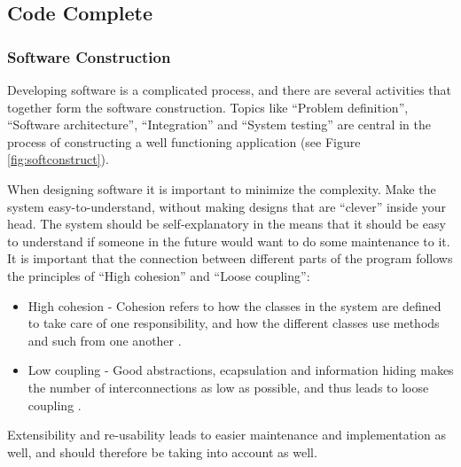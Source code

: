 \subsection{Code Complete}
\subsubsection{Software Construction}
\label{sec:softconstruct}
Developing software is a complicated process, and there are several activities that together form the software construction. Topics like ``Problem definition'', ``Software architecture'', ``Integration'' and ``System testing'' are central in the process of constructing a well functioning application (see Figure \ref{fig:softconstruct}).


When designing software it is important to minimize the complexity. Make the system easy-to-understand, without making designs that are ``clever'' inside your head. The system should be self-explanatory in the means that it should be easy to understand if someone in the future would want to do some maintenance to it. It is important that the connection between different parts of the program follows the principles of ``High cohesion'' and ``Loose coupling'':
\begin{itemize}
	\item High cohesion - Cohesion refers to how the classes in the system are defined to take care of one responsibility, and how the different classes use methods and such from one another \cite{adamcarlson}.
	\item Low coupling - Good abstractions, ecapsulation and information hiding makes the number of interconnections as low as possible, and thus leads to loose coupling \cite{adamcarlson}.
\end{itemize}
Extensibility and re-usability leads to easier maintenance and implementation as well, and should therefore be taking into account as well. 

